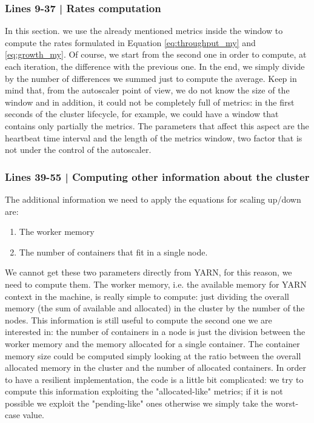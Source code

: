 \documentclass[12pt,twoside,cucitura]{toptesi}
\begin{document}
\subsubsection{Lines 9-37 | Rates computation}
In this section. we use the already mentioned metrics inside the window to compute the rates formulated in Equation \ref{eq:throughput_my} and \ref{eq:growth_my}. Of course, we start from the second one in order to compute, at each iteration, the difference with the previous one. In the end, we simply divide by the number of differences we summed just to compute the average. Keep in mind that, from the autoscaler point of view, we do not know the size of the window and in addition, it could not be completely full of metrics: in the first seconds of the cluster lifecycle, for example, we could have a window that contains only partially the metrics. The parameters that affect this aspect are the heartbeat time interval and the length of the metrics window, two factor that is not under the control of the autoscaler.

\subsubsection{Lines 39-55 | Computing other information about the cluster}
The additional information we need to apply the equations for scaling up/down are:
\begin{enumerate}
	\item The worker memory 
	\item The number of containers that fit in a single node.
\end{enumerate}
We cannot get these two parameters directly from YARN, for this reason, we need to compute them. The worker memory, i.e. the available memory for YARN context in the machine, is really simple to compute: just dividing the overall memory (the sum of available and allocated) in the cluster by the number of the nodes. This information is still useful to compute the second one we are interested in: the number of containers in a node is just the division between the worker memory and the memory allocated for a single container.
The container memory size could be computed simply looking at the ratio between the overall allocated memory in the cluster and the number of allocated containers. In order to have a resilient implementation, the code is a little bit complicated: we try to compute this information exploiting the "allocated-like" metrics; if it is not possible we exploit the "pending-like" ones otherwise we simply take the worst-case value.
\end{document}

